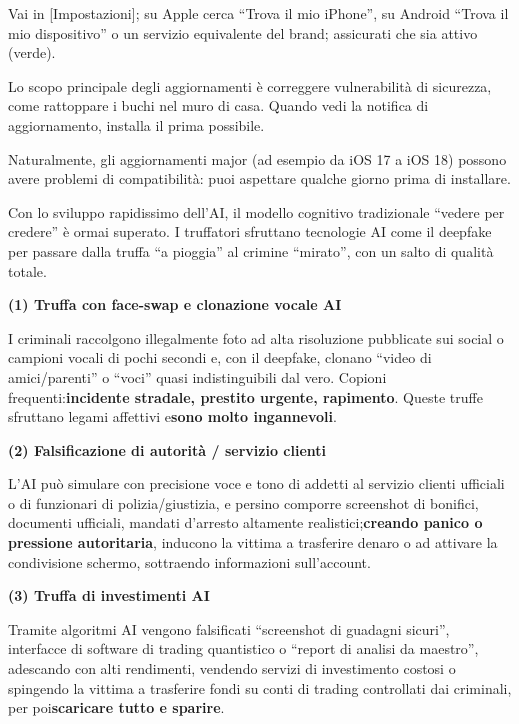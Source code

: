 Vai in [Impostazioni]; su Apple cerca “Trova il mio iPhone”, su Android “Trova il mio dispositivo” o un servizio equivalente del brand; assicurati che sia attivo (verde).


Lo scopo principale degli aggiornamenti è correggere vulnerabilità di sicurezza, come rattoppare i buchi nel muro di casa. Quando vedi la notifica di aggiornamento, installa il prima possibile.

Naturalmente, gli aggiornamenti major (ad esempio da iOS 17 a iOS 18) possono avere problemi di compatibilità: puoi aspettare qualche giorno prima di installare.


Con lo sviluppo rapidissimo dell'AI, il modello cognitivo tradizionale “vedere per credere” è ormai superato. I truffatori sfruttano tecnologie AI come il deepfake per passare dalla truffa “a pioggia” al crimine “mirato”, con un salto di qualità totale.


\textbf{(1) Truffa con face-swap e clonazione vocale AI}\par

I criminali raccolgono illegalmente foto ad alta risoluzione pubblicate sui social o campioni vocali di pochi secondi e, con il deepfake, clonano “video di amici/parenti” o “voci” quasi indistinguibili dal vero. Copioni frequenti:\textbf{incidente stradale, prestito urgente, rapimento}. Queste truffe sfruttano legami affettivi e\textbf{sono molto ingannevoli}.

\textbf{(2) Falsificazione di autorità / servizio clienti}\par

L'AI può simulare con precisione voce e tono di addetti al servizio clienti ufficiali o di funzionari di polizia/giustizia, e persino comporre screenshot di bonifici, documenti ufficiali, mandati d'arresto altamente realistici;\textbf{creando panico o pressione autoritaria}, inducono la vittima a trasferire denaro o ad attivare la condivisione schermo, sottraendo informazioni sull'account.

\textbf{(3) Truffa di investimenti AI}\par

Tramite algoritmi AI vengono falsificati “screenshot di guadagni sicuri”, interfacce di software di trading quantistico o “report di analisi da maestro”, adescando con alti rendimenti, vendendo servizi di investimento costosi o spingendo la vittima a trasferire fondi su conti di trading controllati dai criminali, per poi\textbf{scaricare tutto e sparire}.

